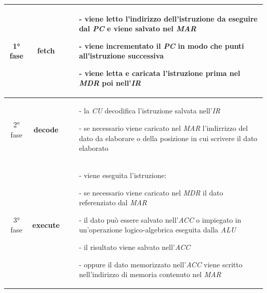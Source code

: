 \documentclass{article}
\begin{document}
\begin{center}
	\begin{tabularx}{\textwidth}{c c X}
		\toprule
		1° fase & \textbf{fetch} &
		\begin{itemize}[topsep=3pt, itemsep=0pt, leftmargin=5pt]
			\item[-] viene letto l'indirizzo dell'istruzione da eseguire dal \textit{PC} e viene salvato nel \textit{MAR}
			\item[-] viene incrementato il \textit{PC} in modo che punti all'istruzione successiva
			\item[-] viene letta e caricata l'istruzione prima nel \textit{MDR} poi nell'\textit{IR}
		\end{itemize} \\
		\midrule
		2° fase & \textbf{decode} &
		\begin{itemize}[topsep=3pt, itemsep=0pt, leftmargin=5pt]
			\item[-] la \textit{CU} decodifica l'istruzione salvata nell'\textit{IR}
			\item[-] se necessario viene caricato nel \textit{MAR} l'indirrizzo del dato da elaborare o della posizione in cui scrivere il dato elaborato 
		\end{itemize} \\
		\midrule
		3° fase & \textbf{execute} &
		\begin{itemize}[topsep=3pt, itemsep=0pt, leftmargin=5pt]
			\item[-] viene eseguita l'istruzione:
			\item[-] se necessario viene caricato nel \textit{MDR} il dato referenziato dal \textit{MAR}
			\item[-] il dato può essere salvato nell'\textit{ACC} o impiegato in un'operazione logico-algebrica eseguita dalla \textit{ALU} 
			\item[-] il risultato viene salvato nell'\textit{ACC}
			\item[-] oppure il dato memorizzato nell'\textit{ACC} viene scritto nell'indirizzo di memoria contenuto nel \textit{MAR}
		\end{itemize} \\
		\bottomrule
	\end{tabularx}
\end{center}
\end{document}
